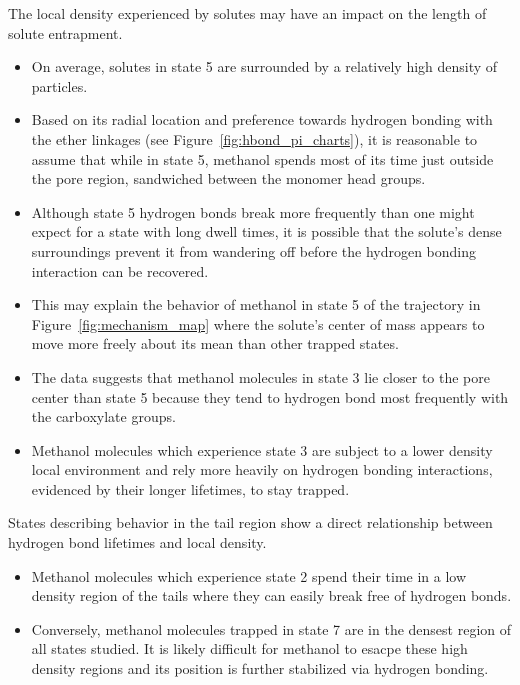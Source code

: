 \documentclass{article}
\begin{document}
  \noindent The local density experienced by solutes may have an impact on the length of solute 
  entrapment.
  \begin{itemize}
    \item On average, solutes in state 5 are surrounded by a relatively high density
    of particles.
    \item Based on its radial location and preference towards hydrogen bonding
    with the ether linkages (see Figure~\ref{fig:hbond_pi_charts}), it is 
    reasonable to assume that while in state 5, methanol spends most of its time just
    outside the pore region, sandwiched between the monomer head groups. 
    \item Although state 5 hydrogen bonds break more frequently than one might expect for 
    a state with long dwell times, it is possible that the solute's dense surroundings
    prevent it from wandering off before the hydrogen bonding interaction can be
    recovered.
    \item This may explain the behavior of methanol in state 5 of the trajectory in
    Figure~\ref{fig:mechanism_map} where the solute's center of mass appears to move
    more freely about its mean than other trapped states.
    \item The data suggests that methanol molecules in state 3 lie closer to the pore
    center than state 5 because they tend to hydrogen bond most frequently with 
    the carboxylate groups.
    \item Methanol molecules which experience state 3 are subject to a lower density 
    local environment and rely more heavily on hydrogen bonding interactions, 
    evidenced by their longer lifetimes, to stay trapped.
  \end{itemize}
  
  States describing behavior in the tail region show a direct relationship between 
  hydrogen bond lifetimes and local density.
  \begin{itemize}
    \item Methanol molecules which experience state 2 spend their time in a low density 
    region of the tails where they can easily break free of hydrogen bonds.
    \item Conversely, methanol molecules trapped in state 7 are in the densest region of all
    states studied. It is likely difficult for methanol to esacpe these high density regions
    and its position is further stabilized via hydrogen bonding.
  \end{itemize}
  
\end{document}
